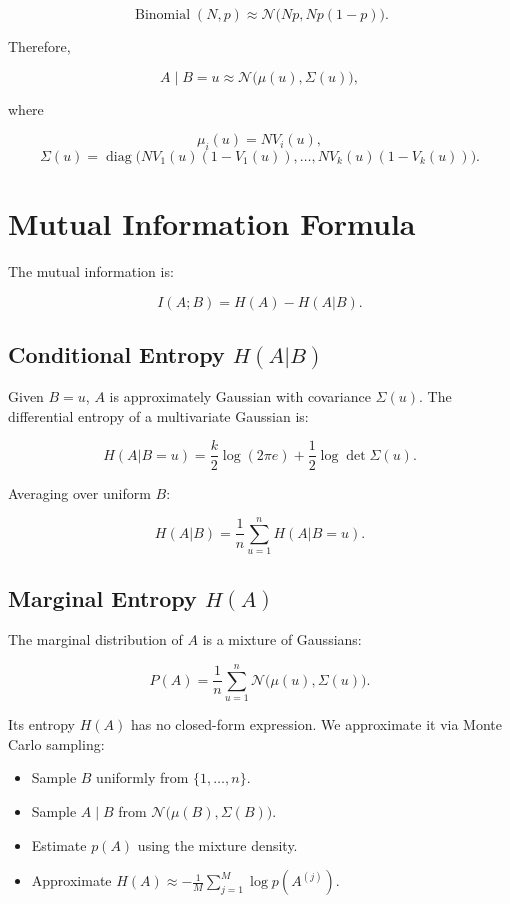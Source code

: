 \documentclass[11pt]{article}
\begin{document}
\[
\operatorname{Binomial}(N, p) \approx \mathcal{N}\big(Np, Np(1-p)\big).
\]

Therefore,

\[
A \mid B = u \approx \mathcal{N}\big(\mu(u), \Sigma(u)\big),
\]

where

\[
\mu_i(u) = N V_i(u),
\]
\[
\Sigma(u) = \operatorname{diag}\big(N V_1(u)(1 - V_1(u)), \ldots, N V_k(u)(1 - V_k(u))\big).
\]

\section*{Mutual Information Formula}

The mutual information is:

\[
I(A; B) = H(A) - H(A|B).
\]

\subsection*{Conditional Entropy $H(A|B)$}

Given $B = u$, $A$ is approximately Gaussian with covariance $\Sigma(u)$. The differential entropy of a multivariate Gaussian is:

\[
H(A|B = u) = \frac{k}{2}\log(2\pi e) + \frac{1}{2} \log \det \Sigma(u).
\]

Averaging over uniform $B$:

\[
H(A|B) = \frac{1}{n} \sum_{u=1}^n H(A|B = u).
\]

\subsection*{Marginal Entropy $H(A)$}

The marginal distribution of $A$ is a mixture of Gaussians:

\[
P(A) = \frac{1}{n} \sum_{u=1}^n \mathcal{N}\big(\mu(u), \Sigma(u)\big).
\]

Its entropy $H(A)$ has no closed-form expression. We approximate it via Monte Carlo sampling:

\begin{itemize}
    \item Sample $B$ uniformly from $\{1, \ldots, n\}$.
    \item Sample $A \mid B$ from $\mathcal{N}\big(\mu(B), \Sigma(B)\big)$.
    \item Estimate $p(A)$ using the mixture density.
    \item Approximate $H(A) \approx - \frac{1}{M} \sum_{j=1}^M \log p(A^{(j)})$.
\end{itemize}
\end{document}
